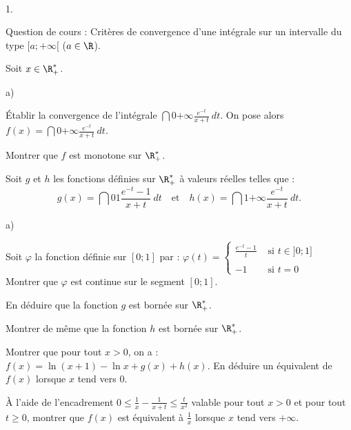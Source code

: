 \documentclass[11pt]{article}%
\begin{document}
\begin{exerciceAP}~
  \begin{noliste}{1.}
    \setlength{\itemsep}{2mm}
  \item Question de cours : Critères de convergence d'une intégrale
    sur un intervalle du type $[a ; +\infty[$ ($a \in \R$).

  \item Soit $x \in \R_+^*$. 
    \begin{noliste}{a)}
    \setlength{\itemsep}{2mm}
    \item Établir la convergence de l'intégrale $\dint{0}{+\infty}
      \frac{ e^{ -t } }{ x + t } \ dt$. On pose alors $f(x) =
      \dint{0}{+\infty} \frac{ e^{ -t } }{ x + t } \ dt$.

    \item Montrer que $f$ est monotone sur $\R_+^*$.

    \end{noliste}

  \item Soit $g$ et $h$ les fonctions définies sur $\R_+^*$ à valeurs
    réelles telles que :
    \[
    g(x) = \dint{0}{1} \frac{ e^{ -t } - 1 }{ x + t } \ dt \ \ \
    \text{ et } \ \ \ h(x) = \dint{1}{+\infty} \frac{ e^{ -t } }{ x +
      t } \ dt .
    \]

    \begin{noliste}{a)}
    \setlength{\itemsep}{2mm}
    \item Soit $\varphi$ la fonction définie sur $[0;1]$ par :
      $\varphi (t) = \left\{ 
        \begin{array}{ll} 
          \frac{ e^{ -t } - 1 }{t} & \text{ si } t \in ] 0 ; 1] \\ 
          \\ 
          -1 & \text{ si } t = 0 
        \end{array} \right.$ \\
      Montrer que $\varphi$ est continue sur le segment $[0;1]$.

    \item En déduire que la fonction $g$ est bornée sur $\R_+^*$.

    \item Montrer de même que la fonction $h$ est bornée sur $\R_+^*$.

    \item Montrer que pour tout $x > 0$, on a : $f(x) = \ln (x+1) -
      \ln x + g(x) + h(x)$. En déduire un équivalent de $f(x)$ lorsque
      $x$ tend vers 0.

    \end{noliste}

  \item À l'aide de l'encadrement $0 \leq \frac{ 1 }{ x } - \frac{ 1
    }{ x + t } \leq \frac{ t }{ x^2 }$ valable pour tout $x > 0$ et
    pour tout $t \geq 0$, montrer que $f(x)$ est équivalent à $\frac{
      1 }{ x } $ lorsque $x$ tend vers $+\infty$.
  \end{noliste}
\end{exerciceAP}
\end{document}
